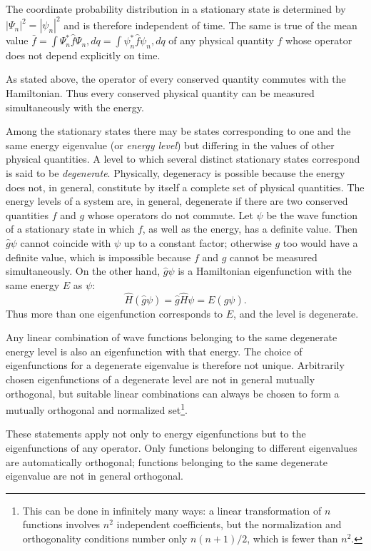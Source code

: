 The coordinate probability distribution in a stationary state is determined
by $|\Psi_n|^2=|\psi_n|^2$ and is therefore independent of time. The same is
true of the mean value
$\bar f=\int\Psi_n^*\hat f\Psi_n,dq=\int\psi_n^*\hat f\psi_n,dq$ of any
physical quantity $f$ whose operator does not depend explicitly on time.

As stated above, the operator of every conserved quantity commutes with the
Hamiltonian. Thus every conserved physical quantity can be measured
simultaneously with the energy.

Among the stationary states there may be states corresponding to one and the
same energy eigenvalue (or \textit{energy level}) but differing in the values
of other physical quantities. A level to which several distinct stationary
states correspond is said to be \textit{degenerate}. Physically, degeneracy is
possible because the energy does not, in general, constitute by itself a
complete set of physical quantities.
The energy levels of a system are, in general, degenerate if there are two
conserved quantities $f$ and $g$ whose operators do not commute. Let $\psi$ be
the wave function of a stationary state in which $f$, as well as the energy,
has a definite value. Then $\hat g\psi$ cannot coincide with $\psi$ up to a
constant factor; otherwise $g$ too would have a definite value, which is
impossible because $f$ and $g$ cannot be measured simultaneously. On the other
hand, $\hat g\psi$ is a Hamiltonian eigenfunction with the same energy $E$ as
$\psi$:
\[
  \hat H(\hat g\psi)=\hat g\hat H\psi=E(\hat g\psi).
\]
Thus more than one eigenfunction corresponds to $E$, and the level is
degenerate.

Any linear combination of wave functions belonging to the same degenerate
energy level is also an eigenfunction with that energy. The choice of
eigenfunctions for a degenerate eigenvalue is therefore not unique. Arbitrarily
chosen eigenfunctions of a degenerate level are not in general mutually
orthogonal, but suitable linear combinations can always be chosen to form a
mutually orthogonal and normalized set\footnote{This can be done in infinitely
many ways: a linear transformation of $n$ functions involves $n^2$ independent
coefficients, but the normalization and orthogonality conditions number only
$n(n+1)/2$, which is fewer than $n^2$.}.

These statements apply not only to energy eigenfunctions but to the
eigenfunctions of any operator. Only functions belonging to different
eigenvalues are automatically orthogonal; functions belonging to the same
degenerate eigenvalue are not in general orthogonal.

